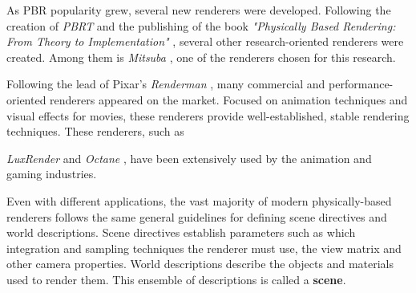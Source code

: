 As PBR popularity grew, several new renderers were developed.
Following the creation of \textit{PBRT} and the publishing of the book 
\textit{"Physically Based Rendering: From Theory to Implementation"} 
\cite{pbrt}, several other research-oriented renderers were created. Among them 
is \textit{Mitsuba} \cite{mitsuba}, one of the renderers chosen for this research.

Following the lead of Pixar's \textit{Renderman} \cite{renderman}, many 
commercial and performance-oriented renderers appeared on the market. Focused on 
animation techniques and visual effects for movies, these renderers provide 
well-established, stable rendering techniques. These renderers, such as 

\textit{LuxRender} \cite{luxrender} and \textit{Octane} \cite{octane}, 
have been extensively used by the animation and gaming industries.

Even with different applications, the vast majority of modern physically-based renderers 
follows the same general guidelines for defining scene directives and world 
descriptions. Scene directives establish parameters such as which integration 
and sampling techniques the renderer must use, the view matrix and other camera 
properties. World descriptions describe the objects and  
materials used to render them. This ensemble of descriptions is called a \textbf{scene}.

